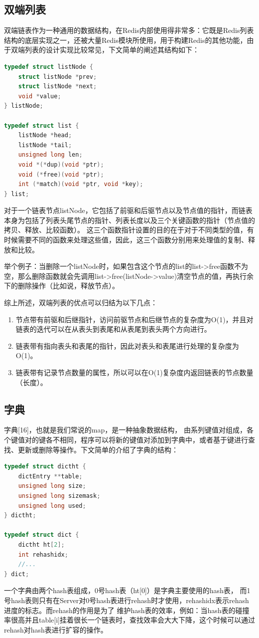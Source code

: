 \documentclass{zjutthesis}
\begin{document}
\subsection{双端列表}
双端链表作为一种通用的数据结构，在Redis内部使用得非常多：它既是Redis列表结构的底层实现之一，还被大量Redis模块所使用，用于构建Redis的其他功能，由于双端列表的设计实现比较常见，下文简单的阐述其结构如下：
\begin{lstlisting}[language=C]
typedef struct listNode {
    struct listNode *prev;
    struct listNode *next;
    void *value;
} listNode;

typedef struct list {
    listNode *head;
    listNode *tail;
    unsigned long len;
    void *(*dup)(void *ptr);
    void (*free)(void *ptr);
    int (*match)(void *ptr, void *key);
} list;
\end{lstlisting}
对于一个链表节点listNode，它包括了前驱和后驱节点以及节点值的指针，而链表本身为包括了列表头尾节点的指针、列表长度以及三个关键函数的指针（节点值的拷贝、释放、比较函数）。
这三个函数指针设置的目的在于对于不同类型的值，有时候需要不同的函数来处理这些值，因此，这三个函数分别用来处理值的复制、释放和比较。

举个例子：当删除一个listNode时，如果包含这个节点的list的list->free函数不为空，那么删除函数就会先调用list->free(listNode->value)清空节点的值，再执行余下的删除操作（比如说，释放节点）。

综上所述，双端列表的优点可以归结为以下几点：

\begin{enumerate}[label=（\arabic*）]
\item{节点带有前驱和后继指针，访问前驱节点和后继节点的复杂度为O(1)，并且对链表的迭代可以在从表头到表尾和从表尾到表头两个方向进行。}
\item{链表带有指向表头和表尾的指针，因此对表头和表尾进行处理的复杂度为O(1)。}
\item{链表带有记录节点数量的属性，所以可以在O(1)复杂度内返回链表的节点数量（长度）。}
\end{enumerate}

\subsection{字典}
字典[16]，也就是我们常说的map，是一种抽象数据结构， 由系列键值对组成，各个键值对的键各不相同，程序可以将新的键值对添加到字典中，或者基于键进行查找、更新或删除等操作。下文简单的介绍了字典的结构：
\begin{lstlisting}[language=C]
typedef struct dictht {
    dictEntry **table;
    unsigned long size;
    unsigned long sizemask;
    unsigned long used;
} dictht;

typedef struct dict {
    dictht ht[2];
    int rehashidx;
    //...
} dict;
\end{lstlisting}
一个字典由两个hash表组成，0号hash表（ht[0]）是字典主要使用的hash表， 而1号hash表则只有在Server对0号hash表进行rehash时才使用，rehashidx表示rehash进度的标志。而rehash的作用是为了
维护hash表的效率，例如：当hash表的碰撞率很高并且table[i]挂着很长一个链表时，查找效率会大大下降，这个时候可以通过rehash对hash表进行扩容的操作。
\end{document}
